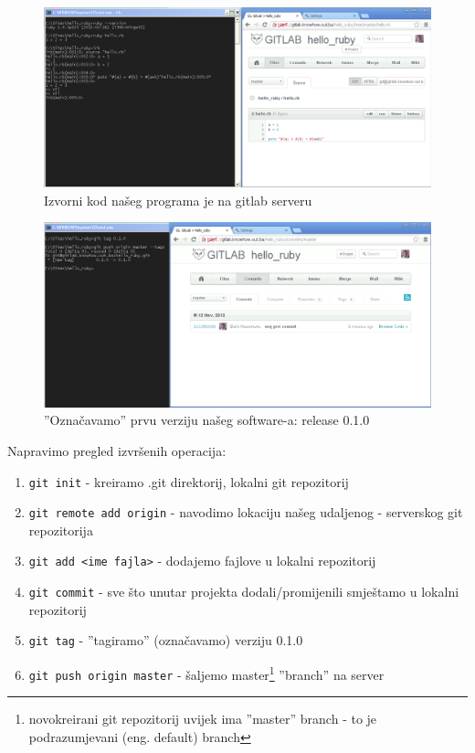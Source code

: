 \documentclass[times, utf8, seminar]{fit}
\begin{document}
\begin{figure}[H]
\centering
\includegraphics[width=15cm]{img/gitlab_first_commit_2.png}
\caption{Izvorni kod našeg programa je na gitlab serveru}
\end{figure}

\begin{figure}[H]
\centering
\includegraphics[width=15cm]{img/gitlab_tag_first_release.png}
\caption{''Označavamo'' prvu verziju našeg software-a: release 0.1.0}
\end{figure}

Napravimo pregled izvršenih operacija:
\begin{enumerate}
  \item \texttt{git init} - kreiramo .git direktorij, lokalni git repozitorij
  \item \texttt{git remote add origin} - navodimo lokaciju našeg udaljenog - serverskog git repozitorija 
  \item \texttt{git add <ime fajla>} - dodajemo fajlove u lokalni repozitorij
  \item \texttt{git commit} - sve što unutar projekta dodali/promijenili smještamo u lokalni repozitorij
  \item \texttt{git tag} - ''tagiramo'' (označavamo) verziju 0.1.0
  \item \texttt{git push origin master} - šaljemo master\footnote{novokreirani git repozitorij uvijek ima ''master'' branch - to je podrazumjevani (eng. default) branch} ''branch'' na server 
\end{enumerate}
\end{document}
